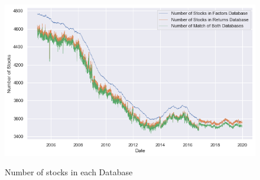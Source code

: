 \begin{figure}[H]
\caption{Number of stocks in each Database}
\centering
\includegraphics[scale=.73]{../../output/figures/match.png}
\label{fig:match}
\end{figure}


%






